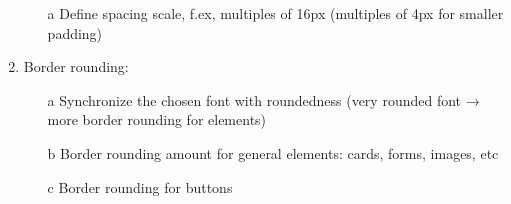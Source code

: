 \documentclass{article}
\begin{document}
\begin{enumerate}
\begin{enumerate}
        \item[a] Define spacing scale, f.ex, multiples of 16px (multiples of 4px for smaller padding)
    \end{enumerate}
    \item  Border rounding:
        \begin{enumerate}
        \item[a] Synchronize the chosen font with roundedness (very rounded font → more border
rounding for elements)
        \item[b]  Border rounding amount for general elements: cards, forms, images, etc
        \item[c] Border rounding for buttons
    \end{enumerate}
\end{enumerate}
\end{document}

